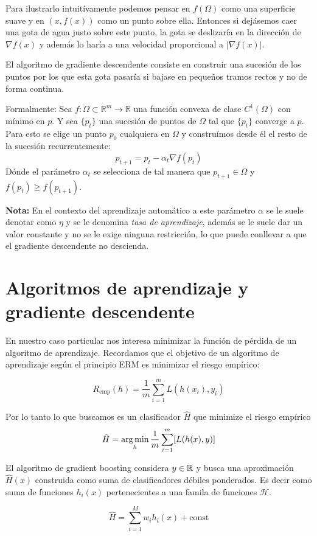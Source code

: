 Para ilustrarlo intuitívamente podemos pensar en $f(\Omega)$ como una superficie suave y en $(x,f(x))$ como un punto sobre ella. Entonces si dejásemos caer una gota de agua justo sobre este punto, la gota se deslizaría en la dirección de $\nabla f(x)$ y además lo haría a una velocidad proporcional a $ | \nabla f(x) |$.

El algoritmo de gradiente descendente consiste en construir una sucesión de los puntos por los que esta gota pasaría si bajase en pequeños tramos rectos y no de forma continua.  

Formalmente:  
Sea $f : \Omega \subset \mathbb{R}^m \rightarrow \mathbb{R}$ una función convexa de clase $C^1(\Omega)$ con mínimo en $p$. Y sea $\{p_t\}$ una sucesión de puntos de $\Omega$ tal que $\{p_t\}$ converge a $ p $. Para esto se elige un punto $p_0$ cualquiera en $\Omega$ y construímos desde él el resto de la sucesión recurrentemente:  
$$ p_{t+1} = p_t - \alpha_t \nabla f(p_t) $$
Dónde el parámetro $\alpha_t$ se selecciona de tal manera que $p_{t+1} \in \Omega$ y \\$ f(p_t) \geq f(p_{t+1})$.  

\textbf{Nota:}
En el contexto del aprendizaje automático a este parámetro $\alpha$ se le suele denotar como $\eta$ y se le denomina \textit{tasa de aprendizaje}, además se le suele dar un valor constante y no se le exige ninguna restricción, lo que puede conllevar a que el gradiente descendente no descienda.  


\section{Algoritmos de aprendizaje y gradiente descendente}
En nuestro caso particular nos interesa minimizar la función de pérdida de un algoritmo de aprendizaje.   
Recordamos que el objetivo de un algoritmo de aprendizaje según el principio ERM es minimizar el riesgo empírico:

$$ R_{\text{emp}}(h) = \frac{1}{m}\sum_{i=1}^m L(h(x_i), y_i) $$

Por lo tanto lo que buscamos es un clasificador $\hat{H}$ que minimize el riesgo empírico
$$\hat{H} = \operatorname*{arg\,min}_h \frac{1}{m}\sum_{i=1}^m [L(h(x), y)]$$

El algoritmo de gradient boosting considera $y \in \operatorname{\mathbb{R}}$ y busca una aproximación $\hat{H}(x)$ construida como suma de clasificadores débiles ponderados. Es decir como suma de funciones $h_i(x)$ pertenecientes a una famila de funciones $\mathcal{H}$.  

$$\hat{H} = \sum_{i=1}^M w_i h_i(x) + \text{const}$$

